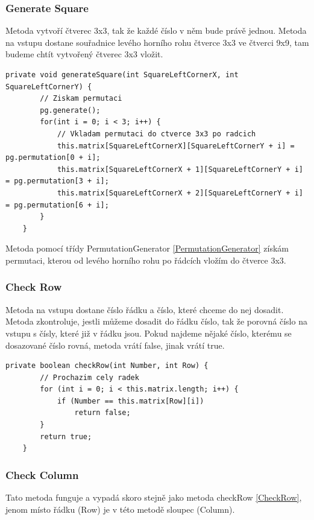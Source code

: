 \label{GenerateSquare}\subsubsection{Generate Square}
Metoda vytvoří čtverec 3x3, tak že každé číslo v něm bude právě jednou. Metoda na vstupu dostane souřadnice levého horního rohu čtverce 3x3 ve čtverci 9x9, tam budeme chtít vytvořený čtverec 3x3 vložit.

\begin{small}
\begin{lstlisting}
private void generateSquare(int SquareLeftCornerX, int SquareLeftCornerY) {
        // Ziskam permutaci
        pg.generate();
        for(int i = 0; i < 3; i++) {
            // Vkladam permutaci do ctverce 3x3 po radcich
            this.matrix[SquareLeftCornerX][SquareLeftCornerY + i] = pg.permutation[0 + i];
            this.matrix[SquareLeftCornerX + 1][SquareLeftCornerY + i] = pg.permutation[3 + i];
            this.matrix[SquareLeftCornerX + 2][SquareLeftCornerY + i] = pg.permutation[6 + i];
        }
    }
\end{lstlisting}
\end{small}

Metoda pomocí třídy PermutationGenerator \ref{PermutationGenerator} získám permutaci, kterou od levého horního rohu po řádcích vložím do čtverce 3x3.

\label{CheckRow}\subsubsection{Check Row}
Metoda na vstupu dostane číslo řádku a číslo, které chceme do nej dosadit. Metoda zkontroluje, jestli můžeme dosadit do řádku číslo, tak že porovná číslo na vstupu s čísly, které již v řádku jsou. Pokud najdeme nějaké číslo, kterému se dosazované číslo rovná, metoda vrátí false, jinak vrátí true.

\begin{small}
\begin{lstlisting}
private boolean checkRow(int Number, int Row) {
        // Prochazim cely radek
        for (int i = 0; i < this.matrix.length; i++) {
            if (Number == this.matrix[Row][i])
                return false;
        }
        return true;
    }
\end{lstlisting}
\end{small}

\label{CheckColumn}\subsubsection{Check Column}
Tato metoda funguje a vypadá skoro stejně jako metoda checkRow \ref{CheckRow}, jenom místo řádku (Row) je v této metodě sloupec (Column).

